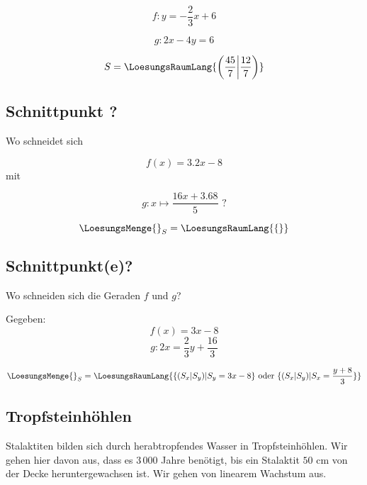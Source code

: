 $$f: y=-\frac23x + 6$$

$$g: 2x-4y = 6$$

\vspace{5mm}
$$S=\LoesungsRaumLang{\left(\frac{45}7\middle|\frac{12}7\right)}$$

\subsection{Schnittpunkt ?}
Wo schneidet sich

$$f(x) = 3.2x - 8$$
mit

$$g: x\mapsto \frac{16x+3.68}5 \text{ ?}$$

\vspace{5mm}
$$\LoesungsMenge{}_S=\LoesungsRaumLang{\{\}}$$

\subsection{Schnittpunkt(e)?}
Wo schneiden sich die Geraden $f$ und $g$?

Gegeben:
$$f(x) = 3x - 8$$
$$g: 2x=\frac23y+\frac{16}3$$

\vspace{5mm}
$$\LoesungsMenge{}_S=\LoesungsRaumLang{\{ (S_x|S_y) | S_y = 3x-8  \} \text{ oder } \{ (S_x|S_y) | S_x = \frac{y+8}3  \}}$$
\subsection{Tropfsteinhöhlen}

Stalaktiten bilden sich durch herabtropfendes Wasser in Tropfsteinhöhlen.
Wir gehen hier davon aus, dass es $3\,000$ Jahre benötigt, bis ein
Stalaktit $50$ cm von der Decke heruntergewachsen ist. Wir gehen von
linearem Wachstum aus.


